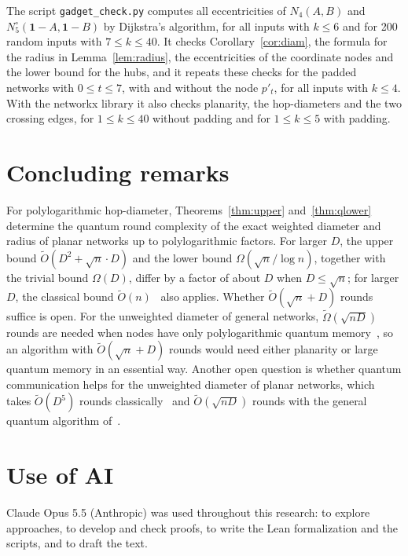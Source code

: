 \documentclass[11pt]{article}
\theoremstyle{definition}
\theoremstyle{remark}
\newcommand{\Ot}{\tilde O}
\begin{document}
The script \texttt{gadget\_check.py} computes all eccentricities of $N_4(A,B)$ and $N^\circ_5(\mathbf 1-A,\mathbf 1-B)$ by Dijkstra's algorithm, for all inputs with $k\le 6$ and for 200 random inputs with $7\le k\le 40$. It checks Corollary~\ref{cor:diam}, the formula for the radius in Lemma~\ref{lem:radius}, the eccentricities of the coordinate nodes and the lower bound for the hubs, and it repeats these checks for the padded networks with $0\le t\le 7$, with and without the node $p'_t$, for all inputs with $k\le 4$. With the networkx library it also checks planarity, the hop-diameters and the two crossing edges, for $1\le k\le 40$ without padding and for $1\le k\le 5$ with padding.

\section{Concluding remarks}

For polylogarithmic hop-diameter, Theorems~\ref{thm:upper} and~\ref{thm:qlower} determine the quantum round complexity of the exact weighted diameter and radius of planar networks up to polylogarithmic factors. For larger $D$, the upper bound $\Ot(D^2+\sqrt n\cdot D)$ and the lower bound $\Omega(\sqrt n/\log n)$, together with the trivial bound $\Omega(D)$, differ by a factor of about $D$ when $D\le\sqrt n$; for larger $D$, the classical bound $\Ot(n)$~\cite{BN19} also applies. Whether $\Ot(\sqrt n + D)$ rounds suffice is open. For the unweighted diameter of general networks, $\tilde\Omega(\sqrt{nD})$ rounds are needed when nodes have only polylogarithmic quantum memory~\cite{LM18}, so an algorithm with $\Ot(\sqrt n+D)$ rounds would need either planarity or large quantum memory in an essential way. Another open question is whether quantum communication helps for the unweighted diameter of planar networks, which takes $\Ot(D^5)$ rounds classically~\cite{LP19} and $\Ot(\sqrt{nD})$ rounds with the general quantum algorithm of~\cite{LM18}.

\section*{Use of AI}

Claude Opus 5.5 (Anthropic) was used throughout this research: to explore approaches, to develop and check proofs, to write the Lean formalization and the scripts, and to draft the text.
\end{document}
